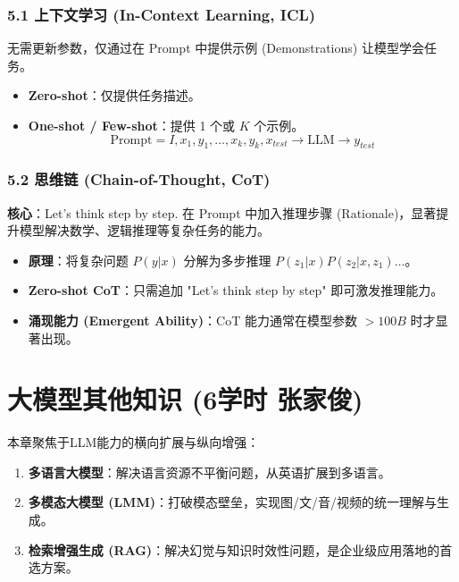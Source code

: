 \documentclass[a4paper, 11pt]{ctexart}
\begin{document}
\subsubsection{5.1 上下文学习 (In-Context Learning, ICL)}
无需更新参数，仅通过在 Prompt 中提供示例 (Demonstrations) 让模型学会任务。
\begin{itemize}
    \item \textbf{Zero-shot}：仅提供任务描述。
    \item \textbf{One-shot / Few-shot}：提供 1 个或 $K$ 个示例。
    $$ \text{Prompt} = I, x_1, y_1, \dots, x_k, y_k, x_{test} \to \text{LLM} \to y_{test} $$
\end{itemize}

\subsubsection{5.2 思维链 (Chain-of-Thought, CoT)}
\textbf{核心}：Let's think step by step.
在 Prompt 中加入推理步骤 (Rationale)，显著提升模型解决数学、逻辑推理等复杂任务的能力。
\begin{itemize}
    \item \textbf{原理}：将复杂问题 $P(y|x)$ 分解为多步推理 $P(z_1|x)P(z_2|x, z_1)\dots$。
    \item \textbf{Zero-shot CoT}：只需追加 "Let's think step by step" 即可激发推理能力。
    \item \textbf{涌现能力 (Emergent Ability)}：CoT 能力通常在模型参数 $>100B$ 时才显著出现。
\end{itemize}
\newpage

\section{大模型其他知识 \small{(6学时 张家俊)}}

\begin{note}[本章概览]
本章聚焦于LLM能力的横向扩展与纵向增强：
\begin{enumerate}
    \item \textbf{多语言大模型}：解决语言资源不平衡问题，从英语扩展到多语言。
    \item \textbf{多模态大模型 (LMM)}：打破模态壁垒，实现图/文/音/视频的统一理解与生成。
    \item \textbf{检索增强生成 (RAG)}：解决幻觉与知识时效性问题，是企业级应用落地的首选方案。
\end{enumerate}
\end{note}

\end{document}
